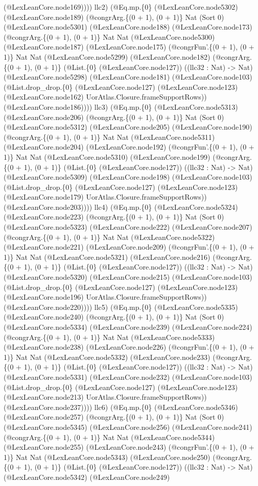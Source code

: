 \documentclass[11pt]{article}
\begin{document}
(@LexLeanCore.node169)))) llc2) (@Eq.mp.\{0\} (@LexLeanCore.node5302) (@LexLeanCore.node189) (@congrArg.\{(0 + 1), (0 + 1)\} Nat (Sort 0) (@LexLeanCore.node5301) (@LexLeanCore.node188) (@LexLeanCore.node173) (@congrArg.\{(0 + 1), (0 + 1)\} Nat Nat (@LexLeanCore.node5300) (@LexLeanCore.node187) (@LexLeanCore.node175) (@congrFun'.\{(0 + 1), (0 + 1)\} Nat Nat (@LexLeanCore.node5299) (@LexLeanCore.node182) (@congrArg.\{(0 + 1), (0 + 1)\} (@List.\{0\} (@LexLeanCore.node127)) ((llc32 : Nat) -> Nat) (@LexLeanCore.node5298) (@LexLeanCore.node181) (@LexLeanCore.node103) (@List.drop\_drop.\{0\} (@LexLeanCore.node127) (@LexLeanCore.node123) (@LexLeanCore.node162) UorAtlas.Closure.frameSupportRows)) (@LexLeanCore.node186)))) llc3) (@Eq.mp.\{0\} (@LexLeanCore.node5313) (@LexLeanCore.node206) (@congrArg.\{(0 + 1), (0 + 1)\} Nat (Sort 0) (@LexLeanCore.node5312) (@LexLeanCore.node205) (@LexLeanCore.node190) (@congrArg.\{(0 + 1), (0 + 1)\} Nat Nat (@LexLeanCore.node5311) (@LexLeanCore.node204) (@LexLeanCore.node192) (@congrFun'.\{(0 + 1), (0 + 1)\} Nat Nat (@LexLeanCore.node5310) (@LexLeanCore.node199) (@congrArg.\{(0 + 1), (0 + 1)\} (@List.\{0\} (@LexLeanCore.node127)) ((llc32 : Nat) -> Nat) (@LexLeanCore.node5309) (@LexLeanCore.node198) (@LexLeanCore.node103) (@List.drop\_drop.\{0\} (@LexLeanCore.node127) (@LexLeanCore.node123) (@LexLeanCore.node179) UorAtlas.Closure.frameSupportRows)) (@LexLeanCore.node203)))) llc4) (@Eq.mp.\{0\} (@LexLeanCore.node5324) (@LexLeanCore.node223) (@congrArg.\{(0 + 1), (0 + 1)\} Nat (Sort 0) (@LexLeanCore.node5323) (@LexLeanCore.node222) (@LexLeanCore.node207) (@congrArg.\{(0 + 1), (0 + 1)\} Nat Nat (@LexLeanCore.node5322) (@LexLeanCore.node221) (@LexLeanCore.node209) (@congrFun'.\{(0 + 1), (0 + 1)\} Nat Nat (@LexLeanCore.node5321) (@LexLeanCore.node216) (@congrArg.\{(0 + 1), (0 + 1)\} (@List.\{0\} (@LexLeanCore.node127)) ((llc32 : Nat) -> Nat) (@LexLeanCore.node5320) (@LexLeanCore.node215) (@LexLeanCore.node103) (@List.drop\_drop.\{0\} (@LexLeanCore.node127) (@LexLeanCore.node123) (@LexLeanCore.node196) UorAtlas.Closure.frameSupportRows)) (@LexLeanCore.node220)))) llc5) (@Eq.mp.\{0\} (@LexLeanCore.node5335) (@LexLeanCore.node240) (@congrArg.\{(0 + 1), (0 + 1)\} Nat (Sort 0) (@LexLeanCore.node5334) (@LexLeanCore.node239) (@LexLeanCore.node224) (@congrArg.\{(0 + 1), (0 + 1)\} Nat Nat (@LexLeanCore.node5333) (@LexLeanCore.node238) (@LexLeanCore.node226) (@congrFun'.\{(0 + 1), (0 + 1)\} Nat Nat (@LexLeanCore.node5332) (@LexLeanCore.node233) (@congrArg.\{(0 + 1), (0 + 1)\} (@List.\{0\} (@LexLeanCore.node127)) ((llc32 : Nat) -> Nat) (@LexLeanCore.node5331) (@LexLeanCore.node232) (@LexLeanCore.node103) (@List.drop\_drop.\{0\} (@LexLeanCore.node127) (@LexLeanCore.node123) (@LexLeanCore.node213) UorAtlas.Closure.frameSupportRows)) (@LexLeanCore.node237)))) llc6) (@Eq.mp.\{0\} (@LexLeanCore.node5346) (@LexLeanCore.node257) (@congrArg.\{(0 + 1), (0 + 1)\} Nat (Sort 0) (@LexLeanCore.node5345) (@LexLeanCore.node256) (@LexLeanCore.node241) (@congrArg.\{(0 + 1), (0 + 1)\} Nat Nat (@LexLeanCore.node5344) (@LexLeanCore.node255) (@LexLeanCore.node243) (@congrFun'.\{(0 + 1), (0 + 1)\} Nat Nat (@LexLeanCore.node5343) (@LexLeanCore.node250) (@congrArg.\{(0 + 1), (0 + 1)\} (@List.\{0\} (@LexLeanCore.node127)) ((llc32 : Nat) -> Nat) (@LexLeanCore.node5342) (@LexLeanCore.node249) 
\end{document}
